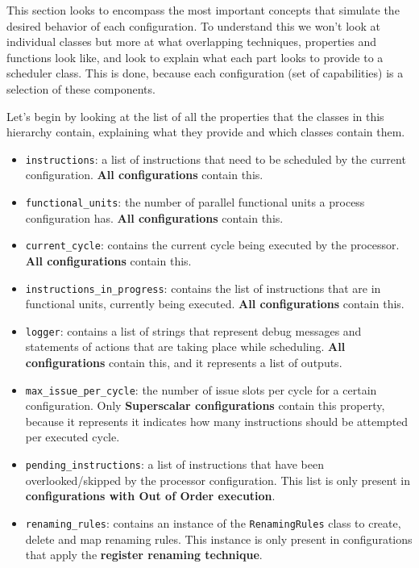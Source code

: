 \documentclass{article}
\begin{document}
This section looks to encompass the most important concepts that simulate the desired behavior of each configuration. To understand this we won't look at individual classes but more at what overlapping techniques, properties and functions look like, and look to explain what each part looks to provide to a scheduler class.  This is done, because each configuration (set of capabilities) is a selection of these components. 

Let's begin by looking at the list of all the properties that the classes in this hierarchy contain, explaining what they provide and which classes contain them.

\begin{itemize}
    \item \lstinline|instructions|: a list of instructions that need to be scheduled by the current configuration. \textbf{All configurations} contain this. 
    \item \lstinline|functional_units|: the number of parallel functional units a process configuration has. \textbf{All configurations} contain this.
    \item \lstinline|current_cycle|: contains the current cycle being executed by the processor. \textbf{All configurations} contain this.
    \item \lstinline|instructions_in_progress|: contains the list of instructions that are in functional units, currently being executed. \textbf{All configurations} contain this.
    \item \lstinline|logger|: contains a list of strings that represent debug messages and statements of actions that are taking place while scheduling. \textbf{All configurations} contain this, and it represents a list of outputs.
    \item \lstinline|max_issue_per_cycle|: the number of issue slots per cycle for a certain configuration. Only \textbf{Superscalar configurations} contain this property, because it represents it indicates how many instructions should be attempted per executed cycle.
    \item \lstinline|pending_instructions|: a list of instructions that have been overlooked/skipped by the processor configuration. This list is only present in \textbf{configurations with Out of Order execution}.
    \item \lstinline|renaming_rules|: contains an instance of the \lstinline|RenamingRules| class to create, delete and map renaming rules. This instance is only present in configurations that apply the \textbf{register renaming technique}. 
\end{itemize}
\end{document}

